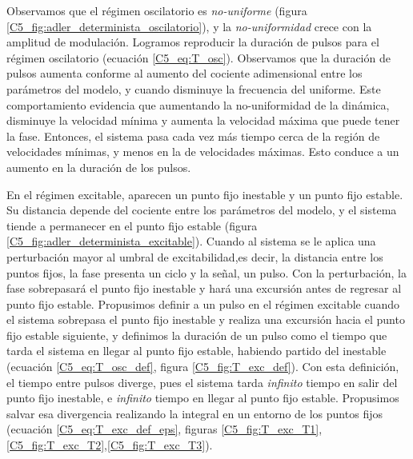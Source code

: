 \documentclass[./main.tex]{subfiles}
\begin{document}
Observamos que el régimen oscilatorio es \emph{no-uniforme} (figura \ref{C5_fig:adler_determinista_oscilatorio}), y la \emph{no-uniformidad} crece con la amplitud de modulación. Logramos reproducir la duración de pulsos para el régimen oscilatorio \cite{Strogatz1994} (ecuación \ref{C5_eq:T_osc}). Observamos que la duración de pulsos aumenta conforme al aumento del cociente adimensional entre los parámetros del modelo, y cuando disminuye la frecuencia del uniforme. Este comportamiento evidencia que aumentando la no-uniformidad de la dinámica, disminuye la velocidad mínima y aumenta la velocidad máxima que puede tener la fase. Entonces, el sistema pasa cada vez más tiempo cerca de la región de velocidades mínimas, y menos en la de velocidades máximas. Esto conduce a un aumento en la duración de los pulsos.


En el régimen excitable, aparecen un punto fijo inestable y un punto fijo estable. Su distancia depende del cociente entre los parámetros del modelo, y el sistema tiende a permanecer en el punto fijo estable (figura \ref{C5_fig:adler_determinista_excitable}). Cuando al sistema se le aplica una perturbación mayor al umbral de excitabilidad,es decir, la distancia entre los puntos fijos, la fase presenta un ciclo y la señal, un pulso. Con la perturbación, la fase sobrepasará el punto fijo inestable y hará una excursión antes de regresar al punto fijo estable. Propusimos definir a un pulso en el régimen excitable cuando el sistema sobrepasa el punto fijo inestable y realiza una excursión hacia el punto fijo estable siguiente, y definimos la duración de un pulso como el tiempo que tarda el sistema en llegar al punto fijo estable, habiendo partido del inestable (ecuación \ref{C5_eq:T_osc_def}, figura \ref{C5_fig:T_exc_def}). Con esta definición, el tiempo entre pulsos diverge, pues el sistema tarda \emph{infinito} tiempo en salir del punto fijo inestable, e \emph{infinito} tiempo en llegar al punto fijo estable. Propusimos salvar esa divergencia realizando la integral en un entorno de los puntos fijos (ecuación \ref{C5_eq:T_exc_def_eps}, figuras \ref{C5_fig:T_exc_T1},\ref{C5_fig:T_exc_T2},\ref{C5_fig:T_exc_T3}). 
\end{document}
